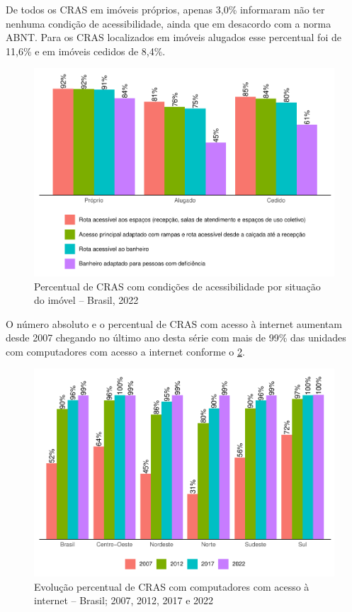 \documentclass[
  brazilian]{report}
\begin{document}
De todos os CRAS em imóveis próprios, apenas 3,0\% informaram não ter
nenhuma condição de acessibilidade, ainda que em desacordo com a norma
ABNT. Para os CRAS localizados em imóveis alugados esse percentual foi
de 11,6\% e em imóveis cedidos de 8,4\%.

\begin{figure}
\includegraphics{Censo-SUAS-2022_files/figure-latex/CRAS-acessibilidade-situacao-1} \caption[Percentual de CRAS com condições de acessibilidade por situação do imóvel – Brasil, 2022]{Percentual de CRAS com condições de acessibilidade por situação do imóvel – Brasil, 2022}\label{fig:CRAS-acessibilidade-situacao}
\end{figure}

O número absoluto e o percentual de CRAS com acesso à internet aumentam
desde 2007 chegando no último ano desta série com mais de 99\% das
unidades com computadores com acesso a internet conforme o
\cref{fig:CRAS-internet-percentual}.

\begin{figure}
\includegraphics{Censo-SUAS-2022_files/figure-latex/CRAS-internet-percentual-1} \caption[Evolução percentual de CRAS com computadores com acesso à internet – Brasil]{Evolução percentual de CRAS com computadores com acesso à internet – Brasil; 2007, 2012, 2017 e 2022}\label{fig:CRAS-internet-percentual}
\end{figure}
\end{document}
